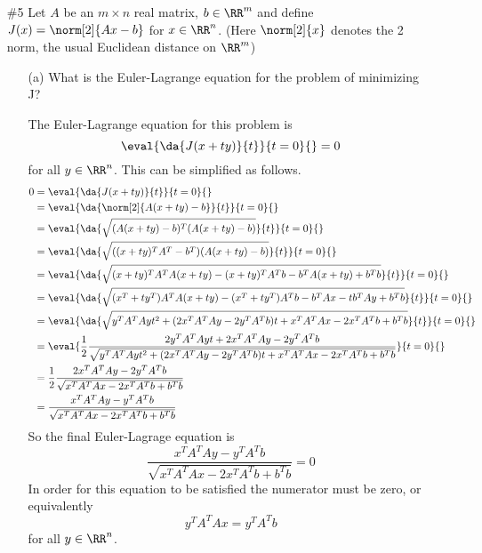 \documentclass[11pt, oneside]{article}
\begin{document}
\begin{enumerate}
  \item[\#5]
    Let $A$ be an $m \times n$ real matrix, $b \in \RR^m$ and define
    $J(x) = \norm[2]{Ax - b}$ for $x \in \RR^n$.
    (Here $\norm[2]{x}$ denotes the 2 norm, the usual Euclidean distance on
    $\RR^m$)
    \begin{enumerate}
      \item[(a)]
        What is the Euler-Lagrange equation for the problem of minimizing J?

        The Euler-Lagrange equation for this problem is
        \[
          \eval{\da{J(x + ty)}{t}}{t = 0}{} = 0
        \]
        for all $y \in \RR^n$.
        This can be simplified as follows.
        \begin{align*}
          0 &= \eval{\da{J(x + ty)}{t}}{t = 0}{} \\
          &= \eval{\da{\norm[2]{A(x + ty) - b}}{t}}{t = 0}{} \\
          &= \eval{\da{\sqrt{(A(x + ty) - b)^T (A(x + ty) - b)}}{t}}{t = 0}{} \\
          &= \eval{\da{\sqrt{((x + ty)^TA^T - b^T) (A(x + ty) - b)}}{t}}{t = 0}{} \\
          &= \eval{\da{\sqrt{(x + ty)^TA^T A(x + ty) - (x + ty)^TA^T b - b^T A(x + ty) + b^Tb}}{t}}{t = 0}{} \\
          &= \eval{\da{\sqrt{(x^T + ty^T) A^T A(x + ty) - (x^T + ty^T) A^T b - b^T A x - t b^T A y + b^Tb}}{t}}{t = 0}{} \\
          &= \eval{\da{\sqrt{y^T A^T A y t^2 + (2x^T A^T A y - 2y^T A^T b) t + x^T A^T A x - 2x^T A^T b + b^Tb}}{t}}{t = 0}{} \\
          &= \eval{\frac{1}{2}\frac{2 y^T A^T A y t + 2x^T A^T A y - 2y^T A^T b}{\sqrt{y^T A^T A y t^2 + (2x^T A^T A y - 2y^T A^T b) t + x^T A^T A x - 2x^T A^T b + b^Tb}}}{t = 0}{} \\
          &= \frac{1}{2}\frac{2x^T A^T A y - 2y^T A^T b}{\sqrt{x^T A^T A x - 2x^T A^T b + b^Tb}} \\
          &= \frac{x^T A^T A y - y^T A^T b}{\sqrt{x^T A^T A x - 2x^T A^T b + b^Tb}} \\
        \end{align*}
        So the final Euler-Lagrage equation is
        \[
          \frac{x^T A^T A y - y^T A^T b}{\sqrt{x^T A^T A x - 2x^T A^T b + b^Tb}} = 0
        \]
        In order for this equation to be satisfied the numerator must be zero,
        or equivalently
        \[
          y^T A^T A x = y^T A^T b
        \]
        for all $y \in \RR^n$.


\end{enumerate}
\end{enumerate}
\end{document}

